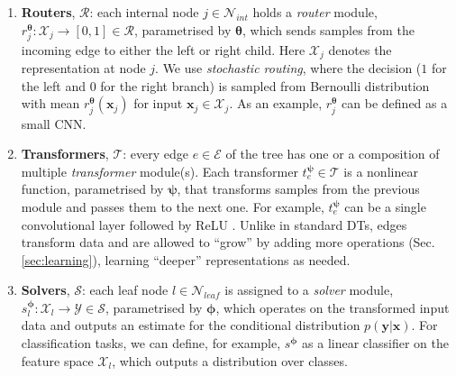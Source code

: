 \begin{enumerate}
  \item \textbf{Routers}, $\mathcal{R}$: each internal node $j \in \mathcal{N}_{int}$ holds a \textit{router} module, $r_{j}^{\mathbf{\boldsymbol{\theta}}}: \mathcal{X}_j \rightarrow [0, 1] \in \mathcal{R}$, parametrised by $\boldsymbol{\theta}$, which sends samples from the incoming edge to either the left or right child. Here $\mathcal{X}_j $ denotes the representation at node $j$. We use \textit{stochastic routing}, where the decision ($1$ for the left and $0$ for the right branch) is sampled from Bernoulli distribution with mean $r_{j}^{\boldsymbol{\theta}}(\mathbf{x}_j)$ for input $\mathbf{x}_j \in \mathcal{X}_j$. As an example, $r_{j}^{\mathbf{\boldsymbol{\theta}}}$ can be defined as a small CNN.
  
  \item \textbf{Transformers}, $\mathcal{T}$: every edge $e \in \mathcal{E}$ of the tree has one or a composition of multiple \textit{transformer} module(s). Each transformer $t_{e}^{\boldsymbol{\psi}} \in \mathcal{T}$ is a nonlinear function, parametrised by $\boldsymbol{\psi}$, that transforms samples from the previous module and passes them to the next one. For example, $t_{e}^{\boldsymbol{\psi}}$ can be a single convolutional layer followed by ReLU \cite{nair2010rectified}. Unlike in standard DTs, edges transform data and are allowed to ``grow'' by adding more operations (Sec. \ref{sec:learning}), learning ``deeper'' representations as needed.%

  \item \textbf{Solvers}, $\mathcal{S}$: each leaf node $l \in \mathcal{N}_{leaf}$ is assigned to a \textit{solver} module, $s_{l}^{\boldsymbol{\phi}}: \mathcal{X}_l \rightarrow \mathcal{Y}\in \mathcal{S}$, parametrised by $\boldsymbol{\phi}$, which operates on the transformed input data and outputs an estimate for the conditional distribution $p(\mathbf{y}|\mathbf{x})$. For classification tasks, we can define, for example, $s^{\boldsymbol{\phi}}$ as a linear classifier on the feature space $\mathcal{X}_l$, which outputs a distribution over classes. 
\end{enumerate}



